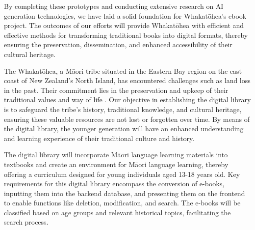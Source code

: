 By completing these prototypes and conducting extensive research on AI generation technologies, we have laid a solid foundation for Whakatōhea's ebook project. The outcomes of our efforts will provide Whakatōhea with efficient and effective methods for transforming traditional books into digital formats, thereby ensuring the preservation, dissemination, and enhanced accessibility of their cultural heritage.

The Whakatōhea, a Māori tribe situated in the Eastern Bay region on the east coast of New Zealand's North Island, has encountered challenges such as land loss in the past. Their commitment lies in the preservation and upkeep of their traditional values and way of life \autocite{Whakatoh25:online}. Our objective in establishing the digital library is to safeguard the tribe's history, traditional knowledge, and cultural heritage, ensuring these valuable resources are not lost or forgotten over time. By means of the digital library, the younger generation will have an enhanced understanding and learning experience of their traditional culture and history.

The digital library will incorporate Māori language learning materials into textbooks and create an environment for Māori language learning, thereby offering a curriculum designed for young individuals aged 13-18 years old. Key requirements for this digital library encompass the conversion of e-books, inputting them into the backend database, and presenting them on the frontend to enable functions like deletion, modification, and search. The e-books will be classified based on age groups and relevant historical topics, facilitating the search process.
